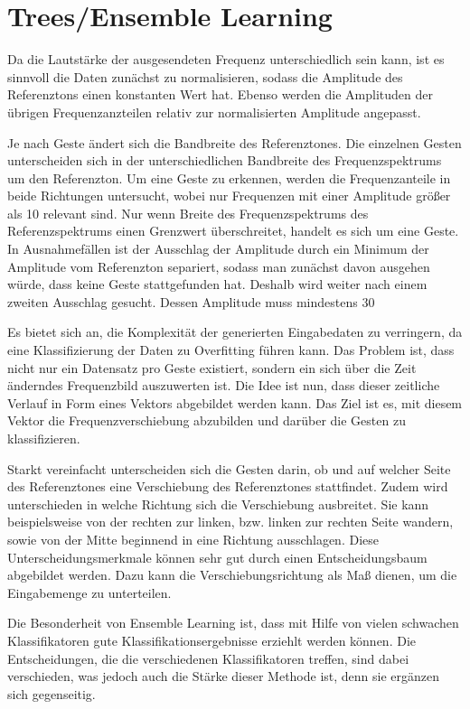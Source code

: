 \section{Trees/Ensemble Learning}

Da die Lautstärke der ausgesendeten Frequenz unterschiedlich sein kann, ist es sinnvoll die Daten 
zunächst zu normalisieren, sodass die Amplitude des Referenztons einen konstanten Wert hat. Ebenso 
werden die Amplituden der übrigen Frequenzanzteilen relativ zur normalisierten Amplitude angepasst.

Je nach Geste ändert sich die Bandbreite des Referenztones.
Die einzelnen Gesten unterscheiden sich in der unterschiedlichen Bandbreite des Frequenzspektrums 
um den Referenzton. Um eine Geste zu erkennen, werden die Frequenzanteile in beide Richtungen 
untersucht, wobei nur Frequenzen mit einer Amplitude größer als 10%
relevant sind. Nur wenn Breite des Frequenzspektrums des Referenzspektrums einen Grenzwert 
überschreitet, handelt es sich um eine Geste. In Ausnahmefällen ist der Ausschlag der Amplitude 
durch ein Minimum der Amplitude vom Referenzton separiert, sodass man zunächst davon ausgehen würde, 
dass keine Geste stattgefunden hat. Deshalb wird weiter nach einem zweiten Ausschlag gesucht. Dessen 
Amplitude muss mindestens 30%

Es bietet sich an, die Komplexität der generierten Eingabedaten zu verringern, da eine Klassifizierung 
der Daten zu Overfitting führen kann. 
Das Problem ist, dass nicht nur ein Datensatz pro Geste existiert, sondern ein sich über die Zeit änderndes 
Frequenzbild auszuwerten ist. 
Die Idee ist nun, dass dieser zeitliche Verlauf in Form eines Vektors abgebildet werden kann. Das Ziel ist es,
mit diesem Vektor die Frequenzverschiebung abzubilden und darüber die Gesten zu klassifizieren. 

Starkt vereinfacht unterscheiden sich die Gesten darin, ob und auf welcher Seite des Referenztones eine 
Verschiebung des Referenztones stattfindet. 
Zudem wird unterschieden in welche Richtung sich die Verschiebung ausbreitet. Sie kann beispielsweise von 
der rechten zur linken, bzw. linken zur rechten Seite wandern, sowie von der Mitte beginnend in eine 
Richtung ausschlagen.
Diese Unterscheidungsmerkmale können sehr gut durch einen Entscheidungsbaum abgebildet werden. Dazu kann 
die Verschiebungsrichtung als Maß dienen, um die Eingabemenge zu unterteilen. 

Die Besonderheit von Ensemble Learning ist, dass mit Hilfe von vielen schwachen Klassifikatoren 
gute Klassifikationsergebnisse erziehlt werden können. Die Entscheidungen, die die verschiedenen 
Klassifikatoren treffen, sind dabei verschieden, was jedoch auch die Stärke dieser Methode ist, 
denn sie ergänzen sich gegenseitig. 

